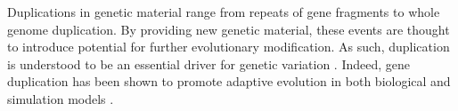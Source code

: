 



Duplications in genetic material range from repeats of gene fragments to whole genome duplication.
By providing new genetic material, these events are thought to introduce potential for further evolutionary modification.
As such, duplication is understood to be an essential driver for genetic variation \citep{Zhang:2003fw,Crow:2006role,Magadum:2013wu}.
Indeed, gene duplication has been shown to promote adaptive evolution in both biological and simulation models \citep{Hu:2010ea}.




